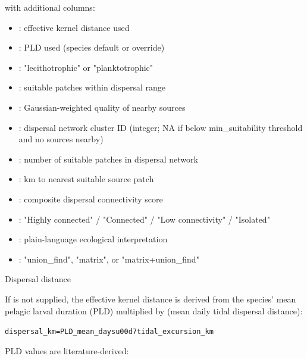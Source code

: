 \documentclass[a4paper]{book}
\begin{document}
%
\begin{Value}
 with additional columns:
\begin{itemize}

\item{} : effective kernel distance used
\item{} : PLD used (species default or override)
\item{} : "lecithotrophic" or "planktotrophic"
\item{} : suitable patches within dispersal range
\item{}  : Gaussian-weighted quality of nearby sources
\item{} : dispersal network cluster ID (integer; NA if
below min\_suitability threshold and no sources nearby)
\item{} : number of suitable patches in dispersal network
\item{} : km to nearest suitable source patch
\item{}  : composite dispersal connectivity score
\item{} : "Highly connected" / "Connected" /
"Low connectivity" / "Isolated"
\item{} : plain-language ecological interpretation
\item{} : "union\_find", "matrix", or "matrix+union\_find"

\end{itemize}

\end{Value}
%
\begin{Section}{Dispersal distance}

If  is not supplied, the effective kernel distance is derived
from the species' mean pelagic larval duration (PLD) multiplied by
 (mean daily tidal dispersal distance):

\begin{alltt}dispersal_km = PLD_mean_days \bsl{}u00d7 tidal_excursion_km
\end{alltt}


PLD values are literature-derived:
\end{Section}
\end{document}
